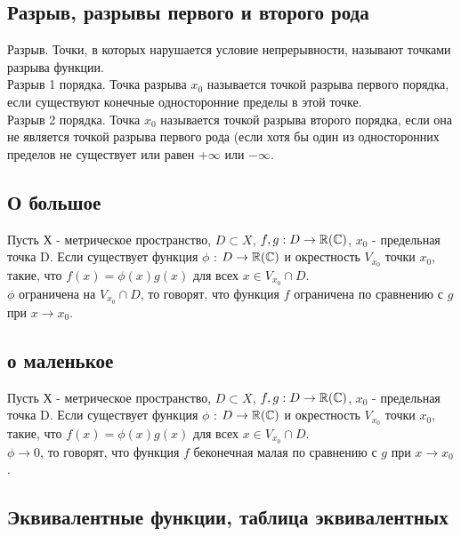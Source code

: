 \newpage
\subsection{Разрыв, разрывы первого и второго рода}
Разрыв. Точки, в которых нарушается условие непрерывности, называют точками разрыва функции.\\
Разрыв 1 порядка. Точка разрыва $x_0$ называется точкой разрыва первого порядка, если существуют
конечные односторонние пределы в этой точке.\\

Разрыв 2 порядка. Точка $x_0$ называется точкой разрыва второго порядка, если она не является точкой разрыва первого рода (если хотя бы один из односторонних пределов не существует или равен +$\infty$ или $-\infty$.

\newpage
\subsection{О большое}

Пусть Х - метрическое пространство, $D \subset X$, $f,g: D \to \operatorname*{\mathbb{R}}(\mathbb{C})$, $x_0$ - предельная точка D. Если существует функция $\phi$ : $D \to \operatorname*{\mathbb{R}}(\mathbb{C})$ и окрестность $V_{x_0}$ точки $x_0$, такие, что $f(x) = \phi(x)g(x)$ для всех 
$x \in V_{x_0} \cap D$.\\
$\phi$ ограничена на $V_{x_0} \cap D$, то  говорят, что функция $f$ ограничена по сравнению с $g$ при $x \to x_0$. 

\newpage
\subsection{о маленькое}

Пусть Х - метрическое пространство, $D \subset X$, $f,g: D \to \operatorname*{\mathbb{R}}(\mathbb{C})$, $x_0$ - предельная точка D. Если существует функция $\phi$ : $D \to \operatorname*{\mathbb{R}}(\mathbb{C})$ и окрестность $V_{x_0}$ точки $x_0$, такие, что $f(x) = \phi(x)g(x)$ для всех 
$x \in V_{x_0} \cap D$.\\
$\phi \to 0$, то  говорят, что функция $f$ беконечная малая по сравнению с $g$ при $x \to x_0$. 

\newpage
\subsection{Эквивалентные функции, таблица эквивалентных}

